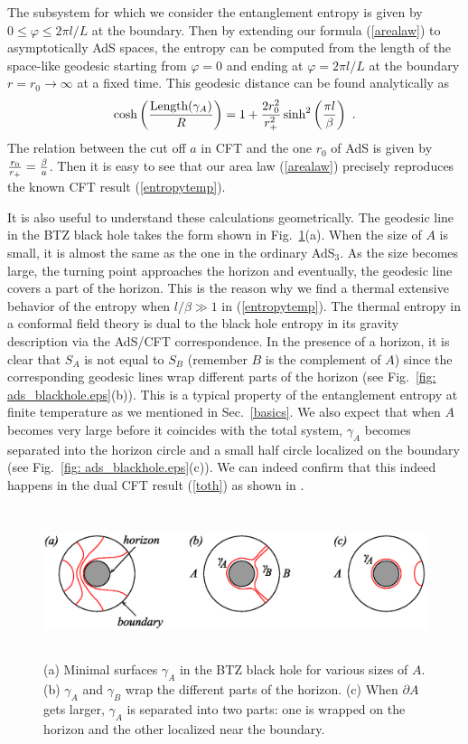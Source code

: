 \documentclass[12pt]{article}
\def\frac#1#2{{#1\over #2}}
\def\de{\partial}
\def\f {\frac}
\def\vp{\varphi}
\def\frac#1#2{{#1\over #2}}
\def\be{\begin{equation}}
\def\ee{\end{equation}}
\begin{document}
The subsystem for which we consider the entanglement entropy is
given by $0\leq \vp\leq 2\pi l/L$ at the boundary. Then by extending
our formula (\ref{arealaw}) to asymptotically AdS spaces,
 the entropy can be computed from the
length of the space-like geodesic starting from $\vp=0$ and ending
at $\vp=2\pi l/L$ at the boundary $r=r_0\to \infty$ at a fixed time.
This geodesic distance can be found analytically as
\be \cosh\left(\f{\mbox{Length}(\gamma_A)}{R}\right)
=1+\f{2r_0^2}{r_+^2}\sinh^2\left(\f{\pi
l}{\beta}\right) \ .\label{delltwo} \ee
The relation between the cut off $a$ in CFT and
the one $r_0$ of AdS is given by $\f{r_0}{r_+}=\f{\beta}{a}$.
Then it is easy to see that our area law
(\ref{arealaw}) precisely reproduces the known CFT result
(\ref{entropytemp}).

It is also useful to understand these calculations geometrically.
The geodesic line in the BTZ black hole takes the form shown in
Fig.\ \ref{fig: ads_blackhole.eps}(a). When the size of $A$ is
small, it is almost the same as the one in the ordinary AdS$_3$. As
the size becomes large, the turning point approaches the horizon and
eventually, the geodesic line covers a part of the horizon. This is
the reason why we find a thermal extensive behavior of the entropy when
$l/\beta\gg 1$ in (\ref{entropytemp}). The thermal entropy in a
conformal field theory is dual to the black hole entropy in its
gravity description via the AdS/CFT correspondence. In the presence
of a horizon, it is clear that $S_A$ is not equal to $S_B$ (remember
$B$ is the complement of $A$) since the corresponding geodesic lines
wrap different parts of the horizon (see Fig.\ \ref{fig:
ads_blackhole.eps}(b)).
This is a typical property of
the entanglement entropy at finite temperature
as we mentioned in Sec.\ \ref{basics}.
We also expect that when $A$ becomes very large before it coincides
with the total system, $\gamma_A$ becomes separated into the horizon circle and
a small half circle localized on the boundary  (see Fig.\ \ref{fig:
ads_blackhole.eps}(c)). We can indeed confirm that this indeed happens in
the dual CFT result (\ref{toth}) as shown in \cite{Azeyanagi:2007bj}.


\begin{figure}
\begin{center}
\includegraphics[height=4.4cm,clip]{ads_blackhole.eps}
\end{center}
\caption{ \label{fig: ads_blackhole.eps} (a) Minimal surfaces
$\gamma_A$ in the BTZ black hole for various sizes of $A$. (b)
$\gamma_A$ and $\gamma_B$ wrap the different parts of the horizon.
(c) When $\de A$ gets larger, $\gamma_A$ is separated into
two parts: one is wrapped on the horizon and the other localized near the boundary.}
\end{figure}
\end{document}
